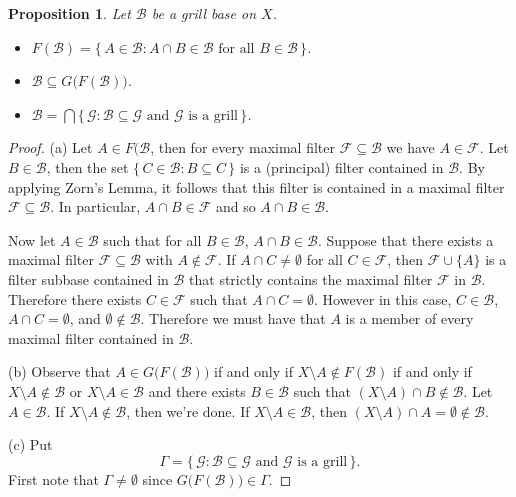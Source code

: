 \documentclass[12pt]{article}
\theoremstyle{plain}
\newtheorem{prop}[thm]{Proposition}
\theoremstyle{definition}
\newcommand{\calB}{\mathcal{B}}
\newcommand{\calF}{\mathcal{F}}
\newcommand{\calG}{\mathcal{G}}
\begin{document}
\begin{prop}
  Let $\calB$ be a grill base on $X$.
  \begin{itemize}
    \item[(a)] $F(\calB) = \{\, A \in \calB : \mbox{$A \cap B \in \calB$ for all $B \in \calB$} \,\}$.

    \item[(b)] $\calB \subseteq G\bigl(F(\calB)\bigr)$.

    \item[(c)] $\calB  = \bigcap\{\, \calG : \mbox{$\calB \subseteq \calG$ and $\calG$ is a grill} \,\}$.
  \end{itemize}
\end{prop}
\begin{proof}
  (a) 
  Let $A \in F(\calB$, then for every maximal filter $\calF \subseteq \calB$ we have $A \in \calF$. 
  Let $B \in \calB$, then the set $\{\, C \in \calB : B \subseteq C \,\}$ is a (principal) filter contained in $\calB$.
  By applying Zorn's Lemma, it follows that this filter is contained in a maximal filter $\calF \subseteq \calB$.
  In particular, $A \cap B \in \calF$ and so $A \cap B \in \calB$.

  Now let $A \in \calB$ such that for all $B \in \calB$, $A \cap B \in \calB$.
  Suppose that there exists a maximal filter $\calF \subseteq \calB$ with $A \not\in \calF$. 
  If $A \cap C \ne \emptyset$ for all $C \in \calF$, then $\calF \cup \{A\}$ is a filter subbase contained in $\calB$ that strictly contains the maximal filter $\calF$ in $\calB$.
  Therefore there exists $C \in \calF$ such that $A \cap C = \emptyset$.
  However in this case, $C \in \calB$, $A \cap C = \emptyset$, and $\emptyset \not\in \calB$.
  Therefore we must have that $A$ is a member of every maximal filter contained in $\calB$.

  (b)
  Observe that $A \in G\bigl(F(\calB)\bigr)$ if and only if $X \setminus A \not\in F(\calB)$ if and only if $X \setminus A \not\in \calB$ or $X \setminus A \in \calB$ and there exists $B \in \calB$ such that $(X \setminus A) \cap B \not\in \calB$.
  Let $A \in \calB$. 
  If $X \setminus A \not\in \calB$, then we're done.
  If $X \setminus A \in \calB$, then $(X \setminus A) \cap A = \emptyset \not\in \calB$.

  (c)
  Put
  \[
    \Gamma = \{\, \calG : \mbox{$\calB \subseteq \calG$ and $\calG$ is a grill} \,\}.
  \]
  First note that $\Gamma \ne \emptyset$ since $G\bigl(F(\calB)\bigr) \in \Gamma$.
  
\end{proof}




\theendnotes



\end{document}
